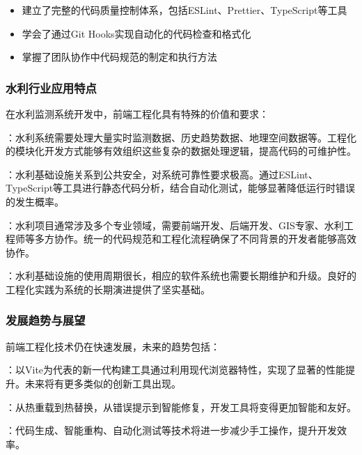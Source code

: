 
\begin{itemize}
\tightlist
\item
  建立了完整的代码质量控制体系，包括ESLint、Prettier、TypeScript等工具
\item
  学会了通过Git Hooks实现自动化的代码检查和格式化
\item
  掌握了团队协作中代码规范的制定和执行方法
\end{itemize}

\hypertarget{ux6c34ux5229ux884cux4e1aux5e94ux7528ux7279ux70b9}{%
\subsubsection{水利行业应用特点}\label{ux6c34ux5229ux884cux4e1aux5e94ux7528ux7279ux70b9}}

在水利监测系统开发中，前端工程化具有特殊的价值和要求：

：水利系统需要处理大量实时监测数据、历史趋势数据、地理空间数据等。工程化的模块化开发方式能够有效组织这些复杂的数据处理逻辑，提高代码的可维护性。

：水利基础设施关系到公共安全，对系统可靠性要求极高。通过ESLint、TypeScript等工具进行静态代码分析，结合自动化测试，能够显著降低运行时错误的发生概率。

：水利项目通常涉及多个专业领域，需要前端开发、后端开发、GIS专家、水利工程师等多方协作。统一的代码规范和工程化流程确保了不同背景的开发者能够高效协作。

：水利基础设施的使用周期很长，相应的软件系统也需要长期维护和升级。良好的工程化实践为系统的长期演进提供了坚实基础。

\hypertarget{ux53d1ux5c55ux8d8bux52bfux4e0eux5c55ux671b}{%
\subsubsection{发展趋势与展望}\label{ux53d1ux5c55ux8d8bux52bfux4e0eux5c55ux671b}}

前端工程化技术仍在快速发展，未来的趋势包括：

：以Vite为代表的新一代构建工具通过利用现代浏览器特性，实现了显著的性能提升。未来将有更多类似的创新工具出现。

：从热重载到热替换，从错误提示到智能修复，开发工具将变得更加智能和友好。

：代码生成、智能重构、自动化测试等技术将进一步减少手工操作，提升开发效率。

